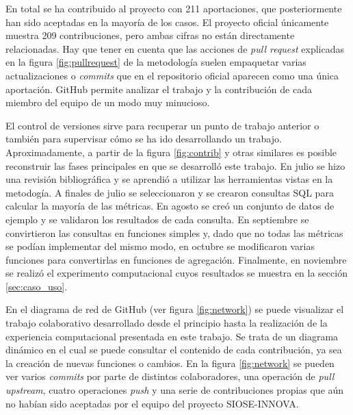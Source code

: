 En total se ha contribuido al proyecto con 211 aportaciones, que posteriormente han sido aceptadas en la mayoría de los casos. El proyecto oficial únicamente muestra 209 contribuciones, pero ambas cifras no están directamente relacionadas. Hay que tener en cuenta que las acciones de \textit{pull request} explicadas en la figura \ref{fig:pullrequest} de la metodología suelen empaquetar varias actualizaciones o \textit{commits} que en el repositorio oficial aparecen como una única aportación. GitHub permite analizar el trabajo y la contribución de cada miembro del equipo de un modo muy minucioso.

El control de versiones sirve para recuperar un punto de trabajo anterior o también para supervisar cómo se ha ido desarrollando un trabajo. Aproximadamente, a partir de la figura \ref{fig:contrib} y otras similares es posible reconstruir las fases principales en que se desarrolló este trabajo. En julio se hizo una revisión bibliográfica y se aprendió a utilizar las herramientas vistas en la metodogía. A finales de julio se seleccionaron y se crearon consultas SQL para calcular la mayoría de las métricas. En agosto se creó un conjunto de datos de ejemplo y se validaron los resultados de cada consulta. En septiembre se convirtieron las consultas en funciones simples y, dado que no todas las métricas se podían implementar del mismo modo, en octubre se modificaron varias funciones para convertirlas en funciones de agregación. Finalmente, en noviembre se realizó el experimento computacional cuyos resultados se muestra en la sección \ref{sec:caso_uso}.

En el diagrama de red de GitHub (ver figura \ref{fig:network}) se puede visualizar el trabajo colaborativo desarrollado desde el principio hasta la realización de la experiencia computacional presentada en este trabajo. Se trata de un diagrama dinámico en el cual se puede consultar el contenido de cada contribución, ya sea la creación de nuevas funciones o cambios. En la figura \ref{fig:network} se pueden ver varios \textit{commits} por parte de distintos colaboradores, una operación de \textit{pull upstream}, cuatro operaciones \textit{push} y una serie de contribuciones propias que aún no habían sido aceptadas por el equipo del proyecto SIOSE-INNOVA.

